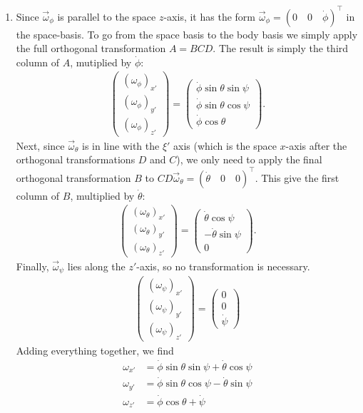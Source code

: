 \documentclass{article}
\theoremstyle{definition}
\begin{document}
\begin{enumerate}[label=(\alph*)]
	\item Since $\vec{\omega}_\phi$ is parallel to the space $z$-axis, it has the form $\vec{\omega}_\phi = (0\quad 0 \quad \dot\phi)^\top$ in the space-basis. To go from the space basis to the body basis we simply apply the full orthogonal transformation $A = BCD$. The result is simply the third column of $A$, mutiplied by $\dot\phi$:
	\begin{align*}
	\begin{pmatrix}
	(\omega_\phi)_{x'} \\
	(\omega_\phi)_{y'} \\
	(\omega_\phi)_{z'} 
	\end{pmatrix}
	= \begin{pmatrix}
	\dot\phi \sin\theta \sin\psi \\ \dot\phi \sin\theta \cos\psi  \\ \dot\phi \cos\theta
	\end{pmatrix}.
	\end{align*}
	Next, since $\vec{\omega}_\theta$ is in line with the $\xi'$ axis (which is the space $x$-axis after the orthogonal transformations $D$ and $C$), we only need to apply the final orthogonal transformation $B$ to $CD\vec{\omega}_\theta = (\dot\theta \quad 0 \quad 0)^\top$. This give the first column of $B$, multiplied by $\dot\theta$:
	\begin{align*}
	\begin{pmatrix}
	(\omega_\theta)_{x'} \\
	(\omega_\theta)_{y'} \\
	(\omega_\theta)_{z'} 
	\end{pmatrix}
	= \begin{pmatrix}
	\dot\theta\cos\psi \\ -\dot\theta\sin\psi \\ 0
	\end{pmatrix}.
	\end{align*}
	Finally, $\vec{\omega}_\psi$ lies along the $z'$-axis, so no transformation is necessary. 
	\begin{align*}
	\begin{pmatrix}
	(\omega_\psi)_{x'} \\
	(\omega_\psi)_{y'} \\
	(\omega_\psi)_{z'} 
	\end{pmatrix} = \begin{pmatrix}
	0 \\ 0 \\ \dot\psi
	\end{pmatrix}
	\end{align*}
	Adding everything together, we find 
	\begin{align*}
	\omega_{x'} &= \dot\phi \sin\theta\sin\psi + \dot\theta \cos\psi  \\
	\omega_{y'} &= \dot\phi \sin\theta \cos\psi - \dot\theta \sin\psi \\
	\omega_{z'} &= \dot\phi \cos\theta + \dot\psi
	\end{align*}
	

\end{enumerate}
\end{document}
